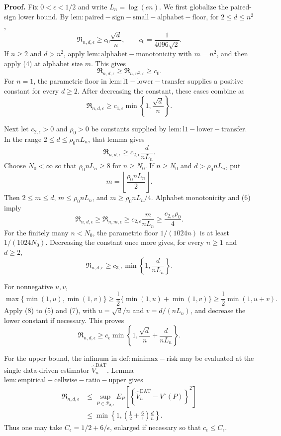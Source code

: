 \textbf{Proof.}
Fix \(0<\epsilon<1/2\) and write \(L_n=\log(en)\).  We first globalize the paired-sign lower bound.  By \(\mathrm{lem:paired-sign-small-alphabet-floor}\), for \(2\le d\le n^2\),
\[
 \mathfrak R_{n,d,\epsilon}\ge c_0\frac{\sqrt d}{n},
 \qquad c_0=\frac1{4096\sqrt2}.
\tag{4}
\]
If \(n\ge2\) and \(d>n^2\), apply \(\mathrm{lem:alphabet-monotonicity}\) with \(m=n^2\), and then apply (4) at alphabet size \(m\).  This gives
\[
 \mathfrak R_{n,d,\epsilon}
 \ge\mathfrak R_{n,n^2,\epsilon}\ge c_0.
\]
For \(n=1\), the parametric floor in \(\mathrm{lem:l1-lower-transfer}\) supplies a positive constant for every \(d\ge2\).  After decreasing the constant, these cases combine as
\[
 \mathfrak R_{n,d,\epsilon}
 \ge c_{1,\epsilon}\min\!\left\{1,\frac{\sqrt d}{n}\right\}.
\tag{5}
\]

Next let \(c_{2,\epsilon}>0\) and \(\rho_0>0\) be constants supplied by \(\mathrm{lem:l1-lower-transfer}\).  In the range \(2\le d\le\rho_0nL_n\), that lemma gives
\[
 \mathfrak R_{n,d,\epsilon}
 \ge c_{2,\epsilon}\frac d{nL_n}.
\tag{6}
\]
Choose \(N_0<\infty\) so that \(\rho_0nL_n\ge8\) for \(n\ge N_0\).  If \(n\ge N_0\) and \(d>\rho_0nL_n\), put
\[
 m=\left\lfloor\frac{\rho_0nL_n}{2}\right\rfloor.
\]
Then \(2\le m\le d\), \(m\le\rho_0nL_n\), and \(m\ge\rho_0nL_n/4\).  Alphabet monotonicity and (6) imply
\[
 \mathfrak R_{n,d,\epsilon}
 \ge\mathfrak R_{n,m,\epsilon}
 \ge c_{2,\epsilon}\frac m{nL_n}
 \ge\frac{c_{2,\epsilon}\rho_0}{4}.
\]
For the finitely many \(n<N_0\), the parametric floor \(1/(1024n)\) is at least \(1/(1024N_0)\).  Decreasing the constant once more gives, for every \(n\ge1\) and \(d\ge2\),
\[
 \mathfrak R_{n,d,\epsilon}
 \ge c_{3,\epsilon}\min\!\left\{1,\frac d{nL_n}\right\}.
\tag{7}
\]

For nonnegative \(u,v\),
\[
 \max\{\min(1,u),\min(1,v)\}
 \ge\frac12\{\min(1,u)+\min(1,v)\}
 \ge\frac12\min(1,u+v).
\tag{8}
\]
Apply (8) to (5) and (7), with \(u=\sqrt d/n\) and \(v=d/(nL_n)\), and decrease the lower constant if necessary.  This proves
\[
 \mathfrak R_{n,d,\epsilon}
 \ge c_\epsilon\min\!\left\{1,
   \frac{\sqrt d}{n}+\frac d{nL_n}
 \right\}.
\tag{9}
\]

For the upper bound, the infimum in \(\mathrm{def:minimax-risk}\) may be evaluated at the single data-driven estimator \(\widehat V_n^{\mathrm{DAT}}\).  Lemma \(\mathrm{lem:empirical-cellwise-ratio-upper}\) gives
\[
 \begin{aligned}
 \mathfrak R_{n,d,\epsilon}
 &\le\sup_{P\in\mathcal P_{d,\epsilon}}
 E_P\!\left[
   \left\{\widehat V_n^{\mathrm{DAT}}-V^\star(P)\right\}^2
 \right]\\
 &\le\min\!\left\{1,
  \left(\frac12+\frac6\epsilon\right)\frac dn
 \right\}.
\tag{10}
 \end{aligned}
\]
Thus one may take \(C_\epsilon=1/2+6/\epsilon\), enlarged if necessary so that \(c_\epsilon\le C_\epsilon\).

